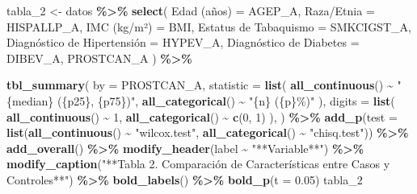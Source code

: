 \documentclass[
]{article}
\newenvironment{Shaded}{\begin{snugshade}}{\end{snugshade}}
\newcommand{\AttributeTok}[1]{\textcolor[rgb]{0.13,0.29,0.53}{#1}}
\newcommand{\DecValTok}[1]{\textcolor[rgb]{0.00,0.00,0.81}{#1}}
\newcommand{\FloatTok}[1]{\textcolor[rgb]{0.00,0.00,0.81}{#1}}
\newcommand{\FunctionTok}[1]{\textcolor[rgb]{0.13,0.29,0.53}{\textbf{#1}}}
\newcommand{\NormalTok}[1]{#1}
\newcommand{\OtherTok}[1]{\textcolor[rgb]{0.56,0.35,0.01}{#1}}
\newcommand{\SpecialCharTok}[1]{\textcolor[rgb]{0.81,0.36,0.00}{\textbf{#1}}}
\newcommand{\StringTok}[1]{\textcolor[rgb]{0.31,0.60,0.02}{#1}}
\begin{document}
\begin{Shaded}
\begin{Highlighting}[]
\NormalTok{tabla\_2 }\OtherTok{\textless{}{-}}\NormalTok{ datos }\SpecialCharTok{\%\textgreater{}\%}
  \FunctionTok{select}\NormalTok{(}
    \StringTok{\textasciigrave{}}\AttributeTok{Edad (años)}\StringTok{\textasciigrave{}} \OtherTok{=}\NormalTok{ AGEP\_A,}
    \StringTok{\textasciigrave{}}\AttributeTok{Raza/Etnia}\StringTok{\textasciigrave{}} \OtherTok{=}\NormalTok{ HISPALLP\_A,}
    \StringTok{\textasciigrave{}}\AttributeTok{IMC (kg/m²)}\StringTok{\textasciigrave{}} \OtherTok{=}\NormalTok{ BMI,}
    \StringTok{\textasciigrave{}}\AttributeTok{Estatus de Tabaquismo}\StringTok{\textasciigrave{}} \OtherTok{=}\NormalTok{ SMKCIGST\_A,}
    \StringTok{\textasciigrave{}}\AttributeTok{Diagnóstico de Hipertensión}\StringTok{\textasciigrave{}} \OtherTok{=}\NormalTok{ HYPEV\_A,}
    \StringTok{\textasciigrave{}}\AttributeTok{Diagnóstico de Diabetes}\StringTok{\textasciigrave{}} \OtherTok{=}\NormalTok{ DIBEV\_A,}
\NormalTok{    PROSTCAN\_A}
\NormalTok{  ) }\SpecialCharTok{\%\textgreater{}\%}
  
  \FunctionTok{tbl\_summary}\NormalTok{(}
    \AttributeTok{by =}\NormalTok{ PROSTCAN\_A,}
    \AttributeTok{statistic =} \FunctionTok{list}\NormalTok{(}
      \FunctionTok{all\_continuous}\NormalTok{() }\SpecialCharTok{\textasciitilde{}} \StringTok{"\{median\} (\{p25\}, \{p75\})"}\NormalTok{,}
      \FunctionTok{all\_categorical}\NormalTok{() }\SpecialCharTok{\textasciitilde{}} \StringTok{"\{n\} (\{p\}\%)"}
\NormalTok{    ),}
    \AttributeTok{digits =} \FunctionTok{list}\NormalTok{(}
      \FunctionTok{all\_continuous}\NormalTok{() }\SpecialCharTok{\textasciitilde{}} \DecValTok{1}\NormalTok{,}
      \FunctionTok{all\_categorical}\NormalTok{() }\SpecialCharTok{\textasciitilde{}} \FunctionTok{c}\NormalTok{(}\DecValTok{0}\NormalTok{, }\DecValTok{1}\NormalTok{)}
\NormalTok{    ),}
\NormalTok{  ) }\SpecialCharTok{\%\textgreater{}\%}
  \FunctionTok{add\_p}\NormalTok{(}\AttributeTok{test =} \FunctionTok{list}\NormalTok{(}\FunctionTok{all\_continuous}\NormalTok{() }\SpecialCharTok{\textasciitilde{}} \StringTok{"wilcox.test"}\NormalTok{,}
                     \FunctionTok{all\_categorical}\NormalTok{() }\SpecialCharTok{\textasciitilde{}} \StringTok{"chisq.test"}\NormalTok{)) }\SpecialCharTok{\%\textgreater{}\%}
  \FunctionTok{add\_overall}\NormalTok{() }\SpecialCharTok{\%\textgreater{}\%}
  \FunctionTok{modify\_header}\NormalTok{(label }\SpecialCharTok{\textasciitilde{}} \StringTok{"**Variable**"}\NormalTok{) }\SpecialCharTok{\%\textgreater{}\%}
  \FunctionTok{modify\_caption}\NormalTok{(}\StringTok{"**Tabla 2. Comparación de Características entre Casos y Controles**"}\NormalTok{) }\SpecialCharTok{\%\textgreater{}\%}
  \FunctionTok{bold\_labels}\NormalTok{() }\SpecialCharTok{\%\textgreater{}\%}
  \FunctionTok{bold\_p}\NormalTok{(}\AttributeTok{t =} \FloatTok{0.05}\NormalTok{)}
\NormalTok{tabla\_2}
\end{Highlighting}
\end{Shaded}
\end{document}
